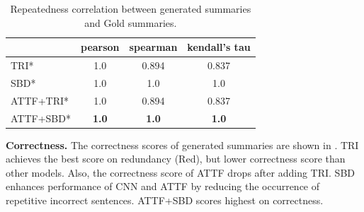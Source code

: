 \begin{table}[th]
	\centering
	\scriptsize
	\begin{tabular}{|l|c|c|c|}
		\hline
		     & pearson  & spearman & kendall's tau \\
		\hline
		TRI* & 1.0 & 0.894 & 0.837  \\
		SBD* & 1.0 & 1.0 & 1.0 \\
		ATTF+TRI* & 1.0 & 0.894 & 0.837 \\
		ATTF+SBD* & \bf 1.0 & \bf 1.0 & \bf 1.0 \\
		\hline
	\end{tabular}
    \caption{Repeatedness correlation between generated summaries and Gold summaries.}
	\label{tab:eval_repcor}
\end{table}



\textbf{Correctness.}
The correctness scores of generated summaries are 
shown in . 
TRI achieves the best score on redundancy (Red), 
but lower correctness score than other models.
Also, the correctness score of ATTF drops after adding TRI.
SBD enhances performance of CNN and ATTF by reducing the occurrence of repetitive incorrect sentences. 
ATTF+SBD scores highest on correctness.

